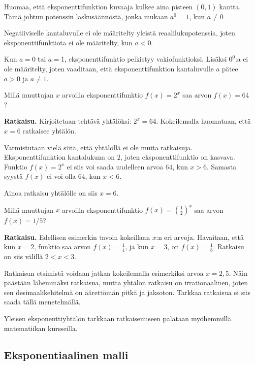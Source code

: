 Huomaa, että eksponenttifunktion kuvaaja kulkee aina pisteen $(0,1)$ kautta. Tämä johtuu potenssin laskusäännöstä, jonka mukaan $a^{0}=1$, kun $a\neq0$

Negatiiviselle kantaluvulle ei ole määritelty yleistä reaalilukupotenssia, 
joten eksponenttifunktiota ei ole määritelty, kun $a < 0$. 

Kun $a=0$ tai $a=1$, eksponenttifunktio pelkistyy vakiofunktioksi.
Lisäksi $0^0$:a ei ole määritelty, joten vaaditaan, että
eksponenttifunktion kantaluvulle $a$ pätee $a>0$ ja $a \neq 1$.


\begin{esimerkki}
Millä muuttujan $x$ arvoilla eksponenttifunktio $f(x) = 2^x$ saa arvon
$f(x) = 64$?

\textbf{Ratkaisu.}
Kirjoitetaan tehtävä yhtälöksi: $2^x = 64$. Kokeilemalla huomataan,
että $x = 6$ ratkaisee yhtälön.

Varmistutaan vielä siitä, että yhtälöllä ei ole muita ratkaisuja.
Eksponenttifunktion kantalukuna on $2$, joten eksponenttifunktio on
kasvava. Funktio $f(x) = 2^x$ ei siis voi saada uudelleen arvoa $64$,
kun $x > 6$. Samasta syystä $f(x)$ ei voi olla $64$, kun $x < 6$.

Ainoa ratkaisu yhtälölle on siis $x = 6$.
\end{esimerkki}

\begin{esimerkki}
Millä muuttujan $x$ arvoilla eksponenttifunktio
$f(x) = \left( \frac{1}{2} \right)^{x}$ saa arvon
$f(x) = 1/5$?

\textbf{Ratkaisu.}
Edellisen esimerkin tavoin kokeillaan $x$:n eri arvoja. Havaitaan,
että kun $x = 2$, funktio saa arvon $f(x) = \frac{1}{4}$, ja
kun $x = 3$, on $f(x) = \frac{1}{8}$. Ratkaisu on siis välillä
$2 < x < 3$.

Ratkaisun etsimistä voidaan jatkaa kokeilemalla esimerkiksi
arvoa $x = 2,5$. Näin päästään lähemmäksi ratkaisua, mutta
yhtälön ratkaisu on irrationaalinen, joten sen desimaalikehitelmä
on äärettömän pitkä ja jaksoton. Tarkkaa ratkaisua ei siis saada tällä menetelmällä.

Yleisen eksponenttiyhtälön tarkkaan ratkaisemiseen palataan myöhemmillä
matematiikan kursseilla.
\end{esimerkki}


\subsection*{Eksponentiaalinen malli}

